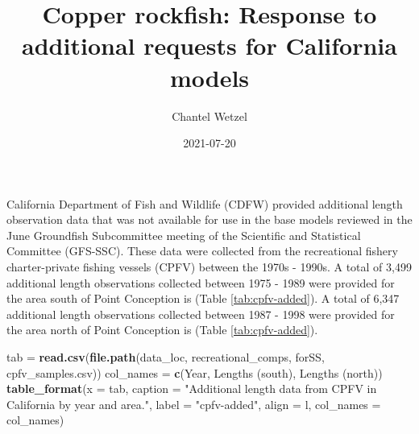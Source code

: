 \documentclass[
]{article}
\title{Copper rockfish: Response to additional requests for California
models}
\author{Chantel Wetzel}
\date{2021-07-20}
\newenvironment{Shaded}{\begin{snugshade}}{\end{snugshade}}
\newcommand{\DataTypeTok}[1]{\textcolor[rgb]{0.13,0.29,0.53}{#1}}
\newcommand{\KeywordTok}[1]{\textcolor[rgb]{0.13,0.29,0.53}{\textbf{#1}}}
\newcommand{\NormalTok}[1]{#1}
\newcommand{\StringTok}[1]{\textcolor[rgb]{0.31,0.60,0.02}{#1}}
\begin{document}
\maketitle

California Department of Fish and Wildlife (CDFW) provided additional
length observation data that was not available for use in the base
models reviewed in the June Groundfish Subcommittee meeting of the
Scientific and Statistical Committee (GFS-SSC). These data were
collected from the recreational fishery charter-private fishing vessels
(CPFV) between the 1970s - 1990s. A total of 3,499 additional length
observations collected between 1975 - 1989 were provided for the area
south of Point Conception is (Table \ref{tab:cpfv-added}). A total of
6,347 additional length observations collected between 1987 - 1998 were
provided for the area north of Point Conception is (Table
\ref{tab:cpfv-added}).

\begin{Shaded}
\begin{Highlighting}[]
\NormalTok{tab =}\StringTok{ }\KeywordTok{read.csv}\NormalTok{(}\KeywordTok{file.path}\NormalTok{(data\_loc, }\StringTok{\textquotesingle{}recreational\_comps\textquotesingle{}}\NormalTok{, }\StringTok{\textquotesingle{}forSS\textquotesingle{}}\NormalTok{, }\StringTok{\textquotesingle{}cpfv\_samples.csv\textquotesingle{}}\NormalTok{))}
\NormalTok{col\_names =}\StringTok{ }\KeywordTok{c}\NormalTok{(}\StringTok{\textquotesingle{}Year\textquotesingle{}}\NormalTok{,}
        \StringTok{\textquotesingle{}Lengths (south)\textquotesingle{}}\NormalTok{,}
              \StringTok{\textquotesingle{}Lengths (north)\textquotesingle{}}\NormalTok{)}
\KeywordTok{table\_format}\NormalTok{(}\DataTypeTok{x =}\NormalTok{ tab,}
             \DataTypeTok{caption =} \StringTok{"Additional length data from CPFV in California by year and area."}\NormalTok{,}
             \DataTypeTok{label =} \StringTok{"cpfv{-}added"}\NormalTok{,}
             \DataTypeTok{align =} \StringTok{\textquotesingle{}l\textquotesingle{}}\NormalTok{,}
             \DataTypeTok{col\_names =}\NormalTok{ col\_names)}
\end{Highlighting}
\end{Shaded}

\begingroup\fontsize{10}{12}\selectfont
\begingroup\fontsize{10}{12}\selectfont
\end{document}
